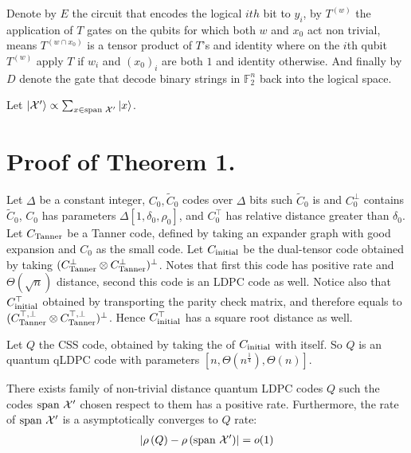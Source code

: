 \documentclass[manuscript,screen,review]{acmart}
\begin{document}
Denote by $E$ the circuit that encodes the logical $ith$ bit to $y_{i}$, by $T^{(w)}$ the application of
$T$ gates on the qubits for which both $w$ and $x_{0}$ act non trivial, means $T^{(w\cap x_0)}$ is a
tensor product of $T$'s and identity where on the $i$th qubit $T^{(w)}$ apply
$T$ if $w_{i}$ and $(x_{0})_{i}$ are both $1$ and identity otherwise. And finally by $D$ denote the gate that decode binary strings in $\mathbb{F}_{2}^{n}$ back into the logical space.

Let $\ket{\mathcal{X}^\prime} \propto \sum_{x \in \text{span } \mathcal{X}^\prime }{\ket{x}}$.
\section{Proof of Theorem 1.}
\begin{definition}
  Let $\Delta$ be a constant integer, $C_{0},\tilde{C}_{0}$ codes over $\Delta$ bits such $\tilde{C}_{0}$ is \trig and $C^{\perp}_{0}$ contains $\tilde{C}_{0}$, $C_{0}$ has parameters $\Delta[1,\delta_{0},\rho_{0}]$, and $C_{0}^\top$ has relative distance greater than $\delta_{0}$. Let $C_{\text{Tanner}}$ be a Tanner code, defined by taking an expander graph with good expansion and $C_{0}$ as the small code. Let $C_{\text{initial}}$ be the dual-tensor code obtained by taking $(C_{\text{Tanner}}^\perp \otimes C_{\text{Tanner}}^\perp )^\perp$. Notes that first this code has positive rate and $\Theta(\sqrt{n})$ distance, second this code is an LDPC code as well. Notice also that $C_{\text{initial}}^{\top}$ obtained by transporting the parity check matrix, and therefore equals to  $(C_{\text{Tanner}}^{\top, \perp} \otimes C_{\text{Tanner}}^{\top, \perp} )^\perp$. Hence $C_{\text{initial}}^{\top}$ has a square root distance as well.

  Let $Q$ the CSS code, obtained by taking the \Hyp of $C_{\text{initial}}$ with itself. So $Q$ is an quantum qLDPC code with parameters $[n, \Theta(n^{\frac{1}{4}}), \Theta(n)]$.
\end{definition}
\begin{claim}
  There exists family of non-trivial distance quantum LDPC codes $Q$ such the codes $\text{span }\mathcal{X}^\prime$ chosen respect to them has a positive rate. Furthermore, the rate of $\text{span }\mathcal{X}^\prime$ is a asymptotically converges to $Q$ rate:
  \begin{equation*}
    \begin{split}
      \left| \rho\left(Q\right) - \rho\left(\text{span }\mathcal{X}^\prime\right) \right| = o(1)
    \end{split}
  \end{equation*}
\end{claim}
\end{document}
